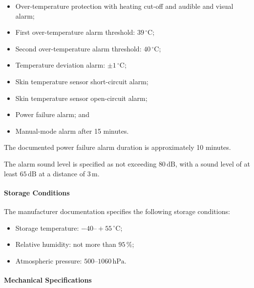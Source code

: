 \begin{itemize}
    \item Over-temperature protection with heating cut-off and
    audible and visual alarm;
    \item First over-temperature alarm threshold:
    \(39\,^\circ\mathrm{C}\);
    \item Second over-temperature alarm threshold:
    \(40\,^\circ\mathrm{C}\);
    \item Temperature deviation alarm: \(\pm 1\,^\circ\mathrm{C}\);
    \item Skin temperature sensor short-circuit alarm;
    \item Skin temperature sensor open-circuit alarm;
    \item Power failure alarm; and
    \item Manual-mode alarm after 15 minutes.
\end{itemize}

The documented power failure alarm duration is approximately
10 minutes.

The alarm sound level is specified as not exceeding
\(80\,\mathrm{dB}\), with a sound level of at least
\(65\,\mathrm{dB}\) at a distance of \(3\,\mathrm{m}\).


\paragraph{Storage Conditions}

The manufacturer documentation specifies the following storage
conditions:

\begin{itemize}
    \item Storage temperature: \(-40\text{--}+55\,^\circ\mathrm{C}\);
    \item Relative humidity: not more than \(95\,\%\);
    \item Atmospheric pressure: \(500\text{--}1060\,\mathrm{hPa}\).
\end{itemize}


\paragraph{Mechanical Specifications}

